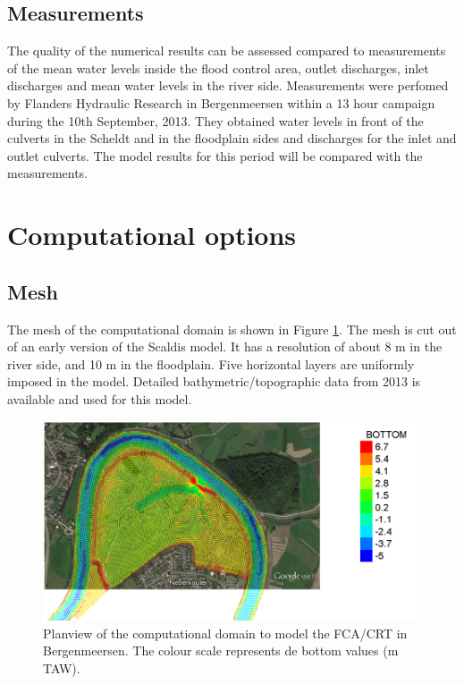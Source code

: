 \subsection{Measurements}
The quality of the numerical results can be assessed compared to measurements of the mean water levels inside the flood control area,
outlet discharges, inlet discharges and mean water levels in the river side.
Measurements were perfomed by Flanders Hydraulic Research in Bergenmeersen
within a 13 hour campaign during the 10th September, 2013.
They obtained water levels in front of the culverts in the Scheldt
and in the floodplain sides and discharges for the inlet and outlet culverts.
The model results for this period will be compared with the measurements.
%
%
\section{Computational options}
%
\subsection{Mesh}
The mesh of the computational domain is shown in Figure \ref{fig:bergenmeersen_figure4}.
The mesh is cut out of an early version of the Scaldis model.
It has a resolution of about 8 m in the river side, and 10 m in the floodplain.
Five horizontal layers are uniformly imposed in the model.
Detailed bathymetric/topographic data from 2013 is available and used for this model.
\begin{figure}[H]
\begin{center}
  \includegraphics[scale=0.5]{img/figure4.png}
\end{center}
\caption{Planview of the computational domain to model the FCA/CRT in Bergenmeersen.
The colour scale represents de bottom values (m TAW).}
\label{fig:bergenmeersen_figure4}
\end{figure}
%
